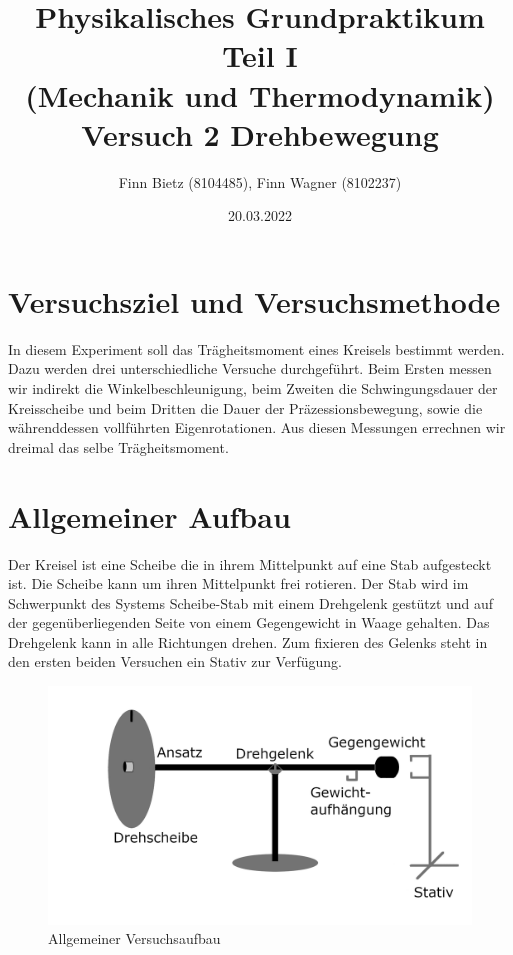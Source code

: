 \documentclass{article}
\date{20.03.2022}
\title{Physikalisches Grundpraktikum Teil I \\ (Mechanik und Thermodynamik) \\ Versuch 2 Drehbewegung}
\author{Finn Bietz (8104485), Finn Wagner (8102237)}
\begin{document}
	\maketitle

	\section{Versuchsziel und Versuchsmethode}
	In diesem Experiment soll das Trägheitsmoment eines Kreisels bestimmt werden.
	Dazu werden drei unterschiedliche Versuche durchgeführt. Beim Ersten messen wir indirekt die Winkelbeschleunigung, beim Zweiten die Schwingungsdauer der Kreisscheibe
	und beim Dritten die Dauer der Präzessionsbewegung, sowie die währenddessen vollführten Eigenrotationen.
	Aus diesen Messungen errechnen wir dreimal das selbe Trägheitsmoment.

	\section{Allgemeiner Aufbau}
	Der Kreisel ist eine Scheibe die in ihrem Mittelpunkt auf eine Stab aufgesteckt ist. Die Scheibe kann um ihren Mittelpunkt frei rotieren.
	Der Stab wird im Schwerpunkt des Systems Scheibe-Stab mit einem Drehgelenk gestützt und auf der gegenüberliegenden Seite von einem Gegengewicht in Waage gehalten.
	Das Drehgelenk kann in alle Richtungen drehen. Zum fixieren des Gelenks steht in den ersten beiden Versuchen ein Stativ zur Verfügung.
	\begin{figure}[!ht]\label{fig:aufbau}
		\centering
		\includegraphics[width=\textwidth]{aufbau.png}
		\caption{Allgemeiner Versuchsaufbau}
	\end{figure}
\end{document}
